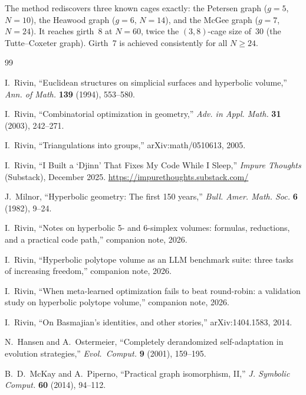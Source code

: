 \documentclass[11pt]{article}
\begin{document}
The method rediscovers three known cages exactly: the Petersen
graph ($g = 5$, $N = 10$), the Heawood graph ($g = 6$, $N = 14$),
and the McGee graph ($g = 7$, $N = 24$).  It reaches girth~8 at
$N = 60$, twice the $(3,8)$-cage size of~30 (the Tutte--Coxeter
graph).  Girth~7 is achieved consistently for all $N \geq 24$.


\begin{thebibliography}{99}

I.~Rivin, ``Euclidean structures on simplicial surfaces and hyperbolic volume,'' \emph{Ann. of Math.} \textbf{139} (1994), 553--580.

I.~Rivin, ``Combinatorial optimization in geometry,'' \emph{Adv. in Appl. Math.} \textbf{31} (2003), 242--271.

I.~Rivin, ``Triangulations into groups,'' arXiv:math/0510613, 2005.

I.~Rivin, ``I Built a `Djinn' That Fixes My Code While I Sleep,'' \emph{Impure Thoughts} (Substack), December 2025. \url{https://impurethoughts.substack.com/}

J.~Milnor, ``Hyperbolic geometry: The first 150 years,'' \emph{Bull. Amer. Math. Soc.} \textbf{6} (1982), 9--24.

I.~Rivin, ``Notes on hyperbolic 5- and 6-simplex volumes: formulas, reductions, and a practical code path,'' companion note, 2026.

I.~Rivin, ``Hyperbolic polytope volume as an LLM benchmark suite: three tasks of increasing freedom,'' companion note, 2026.

I.~Rivin, ``When meta-learned optimization fails to beat round-robin: a validation study on hyperbolic polytope volume,'' companion note, 2026.

I.~Rivin, ``On Basmajian's identities, and other stories,'' arXiv:1404.1583, 2014.

N.~Hansen and A.~Ostermeier, ``Completely derandomized self-adaptation in evolution strategies,'' \emph{Evol.\ Comput.} \textbf{9} (2001), 159--195.

B.~D.~McKay and A.~Piperno, ``Practical graph isomorphism, {II},'' \emph{J. Symbolic Comput.} \textbf{60} (2014), 94--112.


\end{thebibliography}
\end{document}
